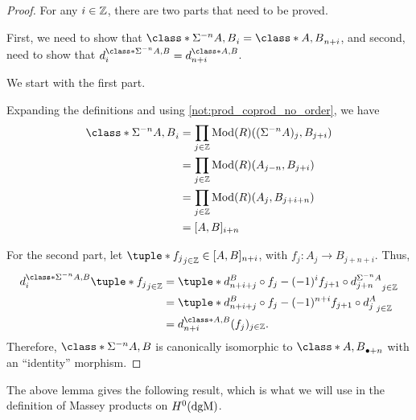 \begin{proof}
    For any \( i \in {\mathbb{Z}} \), there are two parts that need to be proved.

    First, we need to show that \( \class*{\Sigma^{-n} A, B}_i = \class*{A, B}_{n + i} \), and second, need to show that \( d_i^{\class*{\Sigma^{-n} A, B}} = d_{n + i}^{\class*{A, B}} \).

    We start with the first part.

    Expanding the definitions and using \autoref{not:prod_coprod_no_order}, we have
    \begin{align*}
        \class*{\Sigma^{-n} A, B}_i &= \prod_{j \in \Zb} \Mod(R)((\Sigma^{-n} A)_j, B_{j + i}) \\
        &= \prod_{j \in \Zb} \Mod(R)(A_{j - n}, B_{j + i}) \\
        &= \prod_{j \in \Zb} \Mod(R)(A_j, B_{j + i + n}) \\
        &= [A, B]_{i + n}
    \end{align*}

    For the second part, let \( \tuple*{f_j}_{j \in \Zb} \in [A, B]_{n + i} \), with \( f_j: A_j \to B_{j + n + i} \). Thus,
    \begin{align*}
        d_i^{\class*{\Sigma^{-n} A, B}}\tuple*{f_j}_{j \in \Zb} &= \tuple*{d_{n + i + j}^B \circ f_j - (-1)^i f_{j + 1} \circ d_{j + n}^{\Sigma^{-n} A}}_{j \in \Zb} \\
        &= \tuple*{d_{n + i + j}^B \circ f_j - (-1)^{n + i} f_{j + 1} \circ d_j^A}_{j \in \Zb} \\
        &= d_{n + i}^{\class*{A, B}}(f_j)_{j \in \Zb}.
    \end{align*}
    Therefore, \( \class*{\Sigma^{-n} A, B} \) is canonically isomorphic to \( \class*{A, B}_{\bullet+n} \) with an ``identity'' morphism.
\end{proof}

The above lemma gives the following result, which is what we will use in the definition of Massey products on \( H^0(\operatorname{dgM}) \).

